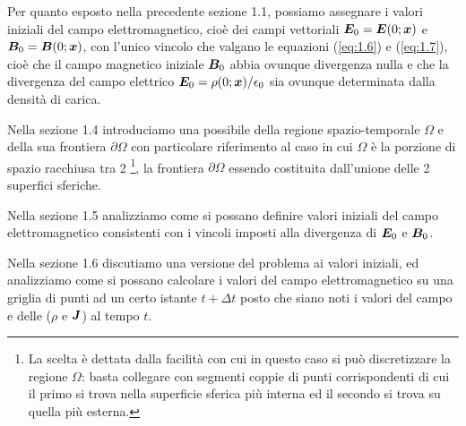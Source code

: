 Per quanto esposto nella precedente sezione 1.1, possiamo assegnare i valori iniziali del campo elettromagnetico, cioè dei campi vettoriali $\vb*{E}_0 = \vb*{E}(0; \vb*{x})$ e $\vb*{B}_0 = \vb*{B}(0; \vb*{x})$, con l'unico vincolo che valgano le equazioni (\ref{eq:1.6}) e (\ref{eq:1.7}), cioè che il campo magnetico iniziale $\vb*{B}_0$ abbia ovunque divergenza nulla e che la divergenza del campo elettrico $\vb*{E}_0 = \rho(0; \vb*{x})/\epsilon_0$ sia ovunque determinata dalla densità di carica. 

Nella sezione 1.4 introduciamo una possibile  della regione spazio-temporale $\Omega$ e della sua frontiera $\partial \Omega$ con particolare riferimento al caso in cui $\Omega$ è la porzione di spazio racchiusa tra 2 \footnote{La scelta è dettata dalla facilità con cui in questo caso si può discretizzare la regione $\Omega$: basta collegare con segmenti  coppie di punti corrispondenti di cui il primo si trova nella superficie sferica più interna ed il secondo si trova su quella più esterna.}, la frontiera $\partial \Omega$ essendo costituita dall'unione delle 2 superfici sferiche. 

Nella sezione 1.5 analizziamo come si possano definire valori iniziali del campo elettromagnetico consistenti con i vincoli imposti alla divergenza di $\vb*{E}_0$ e $\vb*{B}_0$.

Nella sezione 1.6 discutiamo una versione  del problema ai valori iniziali, ed analizziamo come si possano calcolare i valori del campo elettromagnetico su una griglia di punti ad un certo istante $t+\Delta t$ posto che siano noti i valori del campo e delle  ($\rho$ e $\vb*{J}$) al tempo $t$. 

